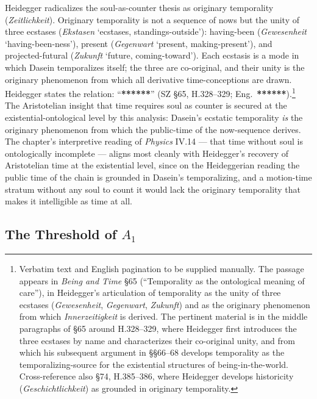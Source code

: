 Heidegger radicalizes the soul-as-counter thesis as originary temporality (\textit{Zeitlichkeit}). Originary temporality is not a sequence of nows but the unity of three ecstases (\textit{Ekstasen} `ecstases, standings-outside'): having-been (\textit{Gewesenheit} `having-been-ness'), present (\textit{Gegenwart} `present, making-present'), and projected-futural (\textit{Zukunft} `future, coming-toward'). Each ecstasis is a mode in which Dasein temporalizes itself; the three are co-original, and their unity is the originary phenomenon from which all derivative time-conceptions are drawn. Heidegger states the relation: ``\textbf{******}'' (SZ \S 65, H.328--329; Eng.~\textbf{******}).\footnote{Verbatim text and English pagination to be supplied manually. The passage appears in \textit{Being and Time} \S 65 (``Temporality as the ontological meaning of care''), in Heidegger's articulation of temporality as the unity of three ecstases (\textit{Gewesenheit}, \textit{Gegenwart}, \textit{Zukunft}) and as the originary phenomenon from which \textit{Innerzeitigkeit} is derived. The pertinent material is in the middle paragraphs of \S 65 around H.328--329, where Heidegger first introduces the three ecstases by name and characterizes their co-original unity, and from which his subsequent argument in \S\S 66--68 develops temporality as the temporalizing-source for the existential structures of being-in-the-world. Cross-reference also \S 74, H.385--386, where Heidegger develops historicity (\textit{Geschichtlichkeit}) as grounded in originary temporality.} The Aristotelian insight that time requires soul as counter is secured at the existential-ontological level by this analysis: Dasein's ecstatic temporality \textit{is} the originary phenomenon from which the public-time of the now-sequence derives. The chapter's interpretive reading of \textit{Physics} IV.14 --- that time without soul is ontologically incomplete --- aligns most cleanly with Heidegger's recovery of Aristotelian time at the existential level, since on the Heideggerian reading the public time of the chain is grounded in Dasein's temporalizing, and a motion-time stratum without any soul to count it would lack the originary temporality that makes it intelligible as time at all.

\subsection{The Threshold of $A_1$}

